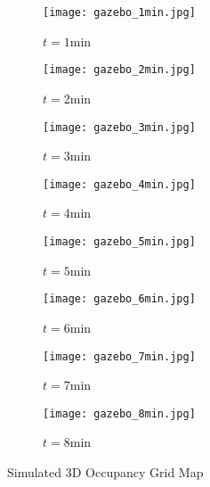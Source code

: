 \begin{figure}[!t]
    	\begin{subfigure}[t]{0.24\columnwidth}
           	\centering
          	\texttt{[image: gazebo\_1min.jpg]}
        		\caption{$t=1$min}
    	\end{subfigure}
    	\begin{subfigure}[t]{0.24\columnwidth}
           	\centering
          	\texttt{[image: gazebo\_2min.jpg]}
        		\caption{$t=2$min}
    	\end{subfigure}
    	\begin{subfigure}[t]{0.24\columnwidth}
           	\centering
          	\texttt{[image: gazebo\_3min.jpg]}
        		\caption{$t=3$min}
   	\end{subfigure}
    	\begin{subfigure}[t]{0.24\columnwidth}
           	\centering
          	\texttt{[image: gazebo\_4min.jpg]}
        		\caption{$t=4$min}
    	\end{subfigure}
	\begin{subfigure}[t]{0.24\columnwidth}
	\vspace*{0.15\columnwidth}
           	\centering
          	\texttt{[image: gazebo\_5min.jpg]}
        		\caption{$t=5$min}
    	\end{subfigure}
    	\begin{subfigure}[t]{0.24\columnwidth}
	\vspace*{0.15\columnwidth}
           	\centering
          	\texttt{[image: gazebo\_6min.jpg]}
        		\caption{$t=6$min}
    	\end{subfigure}
    	\begin{subfigure}[t]{0.24\columnwidth}
	\vspace*{0.15\columnwidth}
           	\centering
          	\texttt{[image: gazebo\_7min.jpg]}
        		\caption{$t=7$min}
   	\end{subfigure}
    	\begin{subfigure}[t]{0.24\columnwidth}
	\vspace*{0.15\columnwidth}
           	\centering
          	\texttt{[image: gazebo\_8min.jpg]}
        		\caption{$t=8$min}
    	\end{subfigure}
\caption{Simulated 3D Occupancy Grid Map}
\label{fig:sim3DMap}
\end{figure}


